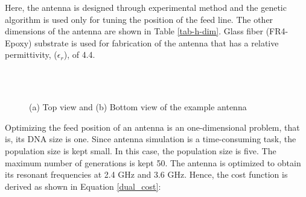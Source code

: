 Here, the antenna is designed through experimental method and the genetic algorithm is used only for tuning the position of the feed line. The other dimensions of the antenna are shown in Table \ref{tab-h-dim}. Glass fiber (FR4-Epoxy) substrate is used for fabrication of the antenna that has a relative permittivity, ($\epsilon_r$), of 4.4.
\begin{figure}[h]
\centering
{}\\
\\
\caption{(a) Top view and (b) Bottom view of the example antenna}\label{h-shaped-topology}
\end{figure}

\begin{table}[h]
\centering
\caption{Dimensions of the test antenna} \label{tab-h-dim}
\label{tab:my-table}
\end{table}

Optimizing the feed position of an antenna is an one-dimensional problem, that is, its DNA size is one. Since antenna simulation is a time-consuming task, the population size is kept small. In this case, the population size is five. The maximum number of generations is kept 50. The antenna is optimized to obtain its resonant frequencies at 2.4 GHz and 3.6 GHz. Hence, the cost function is derived as shown in Equation \ref{dual_cost}:

